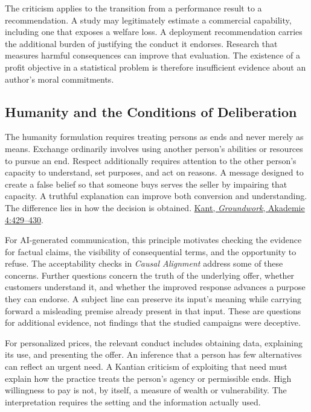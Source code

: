 The criticism applies to the transition from a performance result to a
recommendation. A study may legitimately estimate a commercial
capability, including one that exposes a welfare loss. A deployment
recommendation carries the additional burden of justifying the conduct
it endorses. Research that measures harmful consequences can improve
that evaluation. The existence of a profit objective in a statistical
problem is therefore insufficient evidence about an author's moral
commitments.

\hypertarget{M09-humanity-and-the-conditions-of-deliberation}{%
\subsection{Humanity and the Conditions of
Deliberation}\label{M09-humanity-and-the-conditions-of-deliberation}}

\noindent The humanity formulation requires treating persons as ends and never
merely as means. Exchange ordinarily involves using another person's
abilities or resources to pursue an end. Respect additionally requires
attention to the other person's capacity to understand, set purposes,
and act on reasons. A message designed to create a false belief so that
someone buys serves the seller by impairing that capacity. A truthful
explanation can improve both conversion and understanding. The
difference lies in how the decision is obtained.
\href{https://www.gutenberg.org/ebooks/5682}{Kant, \emph{Groundwork},
Akademie 4:429--430}.

For AI-generated communication, this principle motivates checking the
evidence for factual claims, the visibility of consequential terms, and
the opportunity to refuse. The acceptability checks in \emph{Causal
Alignment} address some of these concerns. Further questions concern the
truth of the underlying offer, whether customers understand it, and
whether the improved response advances a purpose they can endorse. A
subject line can preserve its input's meaning while carrying forward a
misleading premise already present in that input. These are questions
for additional evidence, not findings that the studied campaigns were
deceptive.

For personalized prices, the relevant conduct includes obtaining data,
explaining its use, and presenting the offer. An inference that a person
has few alternatives can reflect an urgent need. A Kantian criticism of
exploiting that need must explain how the practice treats the person's
agency or permissible ends. High willingness to pay is not, by itself, a
measure of wealth or vulnerability. The interpretation requires the
setting and the information actually used.

